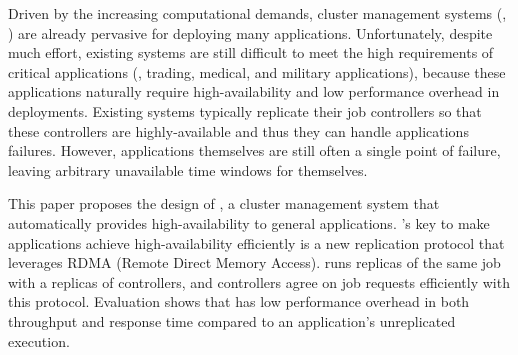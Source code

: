 
Driven by the increasing computational demands, cluster management systems 
(\eg, \mesos) are already pervasive for deploying many applications. 
Unfortunately, despite much effort, existing systems are still difficult to 
meet the high requirements of critical applications (\eg, trading, medical, and 
military applications), because these applications naturally require 
high-availability and low performance overhead in deployments. Existing systems 
typically replicate their job controllers so that these controllers are 
highly-available and thus they can handle applications failures. However, 
applications themselves are still often a single point of failure, leaving 
arbitrary unavailable time windows for themselves.


This paper proposes the design of \xxx, a cluster management system that 
automatically provides high-availability to general applications. \xxx's key to 
make applications achieve high-availability efficiently is a new \paxos 
replication protocol that leverages RDMA (Remote Direct Memory Access). \xxx 
runs replicas of the same job with a replicas of controllers, and 
controllers agree on job requests efficiently with this protocol.
Evaluation shows that \xxx has low performance overhead in 
both throughput and response time compared to an application's 
unreplicated execution.


